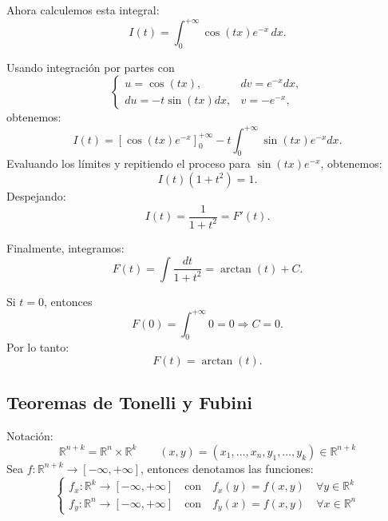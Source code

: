 {Ahora calculemos esta integral:
\[ I(t) = \int_{0}^{+\infty} \cos(tx) e^{-x} \,dx. \]

Usando integración por partes con
\[
    \begin{cases}
        u = \cos(tx),      & dv = e^{-x}dx, \\
        du = -t\sin(tx)dx, & v = -e^{-x},
    \end{cases}
\]
obtenemos:
\[ I(t) = [\cos(tx) e^{-x}]_{0}^{+\infty} - t \int_{0}^{+\infty} \sin(tx) e^{-x}dx. \]
Evaluando los límites y repitiendo el proceso para \( \sin(tx) e^{-x} \),
obtenemos:
\[ I(t) (1+t^2) = 1. \]
Despejando:
\[ I(t) = \frac{1}{1+t^2} = F'(t). \]

Finalmente, integramos:
\[ F(t) = \int \frac{dt}{1+t^2} = \arctan(t) + C. \]

Si \( t = 0 \), entonces
\[ F(0) = \int_{0}^{+\infty} 0 = 0 \Rightarrow C = 0. \]
Por lo tanto:
\[ F(t) = \arctan(t). \]
}

\subsection{Teoremas de Tonelli y Fubini}

Notación:
\[
    \mathbb{R}^{n+k} = \mathbb{R}^n \times \mathbb{R}^k \qquad (x, y)
    = (x_1, \dots, x_n, y_1, \dots, y_k) \in \mathbb{R}^{n+k}
\]
Sea $f: \mathbb{R}^{n+k} \to [-\infty, +\infty]$, entonces denotamos las
funciones:
\[
    \begin{cases}
        f_{x}: \mathbb{R}^k \to [-\infty,+ \infty] \quad \text{con} \quad f_{x}(y) = f(x, y) \quad \forall y \in \mathbb{R}^k \\
        f_{y}: \mathbb{R}^n \to [-\infty,+ \infty] \quad \text{con} \quad f_{y}(x) = f(x, y) \quad \forall x \in \mathbb{R}^n
    \end{cases}
\]

